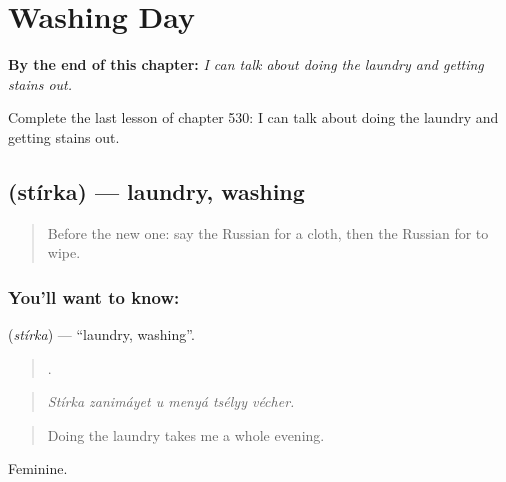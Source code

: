 
\chapter{Washing Day}
\label{ch:ru-washing-day}

\begin{chapteropening}
\textbf{By the end of this chapter:} \emph{I can talk about doing the laundry and getting stains out.}

Complete the last lesson of chapter 530: I can talk about doing the laundry and getting stains out.
\end{chapteropening}

\section[\texorpdfstring{\ru{стирка} (stírka)}{стирка (stírka)}]{ (stírka) — laundry, washing}

\label{lesson:RU-C530-stirka}



\begin{quote}
Before the new one: say the Russian for a cloth, then the Russian for to wipe.
\end{quote}

\subsection*{You'll want to know: }
\textbf{} (\emph{stírka}) — \textquotedblleft{}laundry, washing\textquotedblright{}.

\begin{quote}
     .
\end{quote}

\begin{quote}
\emph{Stírka zanimáyet u menyá tsélyy vécher.}
\end{quote}

\begin{quote}
Doing the laundry takes me a whole evening.
\end{quote}

Feminine.

